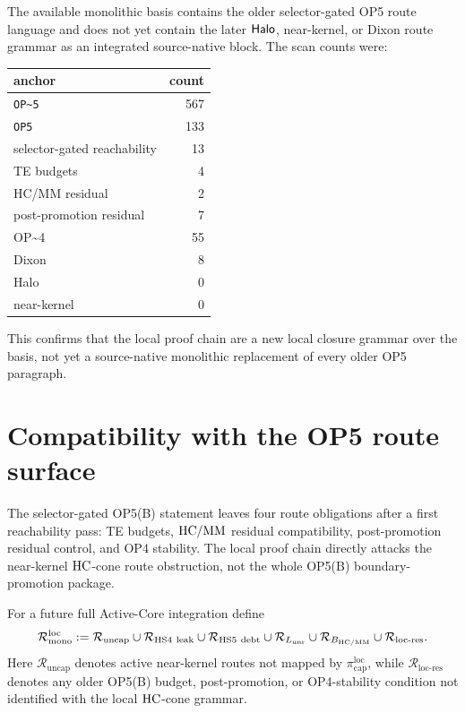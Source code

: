 The available monolithic basis contains the older selector-gated OP5 route
language and does not yet contain the later \(\mathsf{Halo}\), near-kernel, or Dixon
route grammar as an integrated source-native block. The scan counts were:

\begin{center}\small
\begin{tabular}{lr}
\toprule
anchor & count\\
\midrule
\texttt{OP\textasciitilde5} & 567\\
\texttt{OP5} & 133\\
selector-gated reachability & 13\\
TE budgets & 4\\
HC/MM residual & 2\\
post-promotion residual & 7\\
OP\textasciitilde4 & 55\\
Dixon & 8\\
Halo & 0\\
near-kernel & 0\\
\bottomrule
\end{tabular}
\end{center}

This confirms that the local proof chain are a new local closure grammar over the basis,
not yet a source-native monolithic replacement of every older OP5 paragraph.

\section{Compatibility with the OP5 route surface}

The selector-gated OP5(B) statement leaves four route obligations after a
first reachability pass: TE budgets, \(\mathrm{HC}/\mathrm{MM}\) residual compatibility,
post-promotion residual control, and OP4 stability. The local proof chain directly
attacks the near-kernel \(\mathrm{HC}\)-cone route obstruction, not the whole OP5(B)
boundary-promotion package.

\begin{definition}
For a future full Active-Core integration define
\[
\mathcal R_{\mathrm{mono}}^{\mathrm{loc}}
:=
\mathcal R_{\mathrm{uncap}}
\cup
\mathcal R_{\mathrm{HS4\ leak}}
\cup
\mathcal R_{\mathrm{HS5\ debt}}
\cup
\mathcal R_{L_{\mathrm{unr}}}
\cup
\mathcal R_{B_{\mathrm{HC}/\mathrm{MM}}}
\cup
\mathcal R_{\mathrm{loc\text{-}res}}.
\]
Here \(\mathcal R_{\mathrm{uncap}}\) denotes active near-kernel routes not mapped
by \(\pi_{\mathrm{cap}}^{\mathrm{loc}}\), while \(\mathcal R_{\mathrm{loc\text{-}res}}\)
denotes any older OP5(B) budget, post-promotion, or OP4-stability condition
not identified with the local \(\mathrm{HC}\)-cone grammar.
\end{definition}

